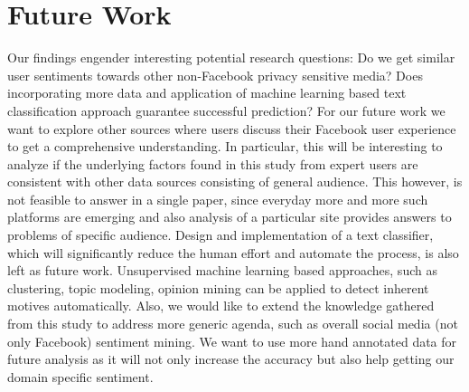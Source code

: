 \section{Future Work}
\label{sec:futurework}
Our findings engender interesting potential research questions: Do we get similar user sentiments towards other non-Facebook privacy sensitive media? Does incorporating more data and application of machine learning based text classification approach guarantee successful prediction? For our future work we want to explore other sources where users discuss their Facebook user experience to get a comprehensive understanding. In particular, this will be interesting to analyze if the underlying factors found in this study from expert users are consistent with other data sources consisting of general audience. This however, is not feasible to answer in a single paper, since everyday more and more such platforms are emerging and also analysis of a particular site provides answers to problems of specific audience. Design and implementation of a text classifier, which will significantly reduce the human effort and automate the process, is also left as future work. Unsupervised machine learning based approaches, such as clustering, topic modeling, opinion mining can be applied to detect inherent motives automatically. Also, we would like to extend the knowledge gathered from this study to address more generic agenda, such as overall social media (not only Facebook) sentiment mining. We want to use more hand annotated data for future analysis as it will not only increase the accuracy but also help getting our domain specific sentiment.